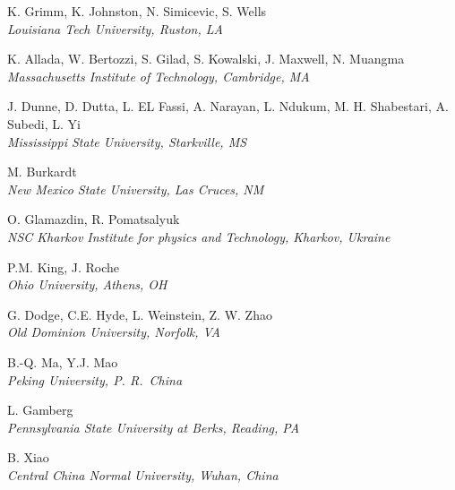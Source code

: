 \documentclass[12pt]{article}
\begin{document}
\begin{center}
\large{K. Grimm, K. Johnston, N. Simicevic, S. Wells}\\
\it{Louisiana Tech University, Ruston, LA}
\end{center}

\begin{center}
\large{K. Allada, W. Bertozzi, S. Gilad, S. Kowalski, J. Maxwell, N. Muangma}\\ 
\it{Massachusetts Institute of Technology, Cambridge, MA}  
\end{center}

\begin{center}
\large{J. Dunne, D. Dutta, L. EL Fassi, A. Narayan, L. Ndukum, M. H. Shabestari, A. Subedi, L. Yi}\\ 
\it{Mississippi State University, Starkville, MS}  
\end{center}


\begin{center}
\large{M. Burkardt} \\
\it{New Mexico State University, Las Cruces, NM}
\end{center}

\begin{center}
\large{O. Glamazdin, R. Pomatsalyuk} \\
\it{NSC Kharkov Institute for physics and Technology, Kharkov, Ukraine}
\end{center}


\begin{center}
\large{P.M. King, J. Roche}\\ 
\it{Ohio University, Athens, OH}  
\end{center}
\begin{center}

\large{G. Dodge, C.E. Hyde, L. Weinstein, Z. W. Zhao}\\ 
\it{Old Dominion University, Norfolk, VA}  
\end{center}

\begin{center}
\large {B.-Q. Ma, Y.J. Mao}\\
\it{Peking University, P. R.~China}
\end{center}


\begin{center}
\large{L. Gamberg}\\ 
\it{Pennsylvania State University at Berks, Reading, PA}  
\end{center}

\begin{center}
\large{B. Xiao}\\ 
\it{Central China Normal University, Wuhan, China}  
\end{center}
\end{document}
